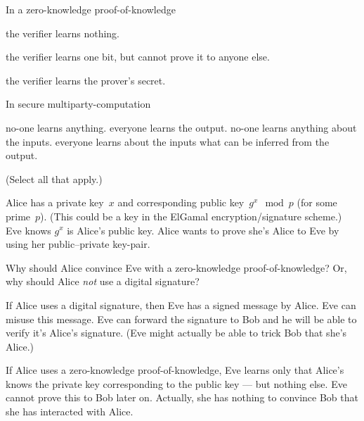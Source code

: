 \questions
In a zero-knowledge proof-of-knowledge
\begin{choices}
  \choice the verifier learns nothing.

  \CorrectChoice the verifier learns one bit, but cannot prove it to anyone 
  else.

  \choice the verifier learns the prover's secret.
\end{choices}


\question
In secure multiparty-computation
\begin{checkboxes}
  \choice no-one learns anything.
  \CorrectChoice everyone learns the output.
  \choice no-one learns anything about the inputs.
  \CorrectChoice everyone learns about the inputs what can be inferred from the 
  output.
\end{checkboxes}
(Select all that apply.)


\question[3]
Alice has a private key~\(x\) and corresponding public key~\(g^x \mod p\) (for 
some prime~\(p\)).
(This could be a key in the ElGamal encryption/signature scheme.)
Eve knows \(g^x\) is Alice's public key.
Alice wants to prove she's Alice to Eve by using her public--private key-pair.

Why should Alice convince Eve with a zero-knowledge proof-of-knowledge?
Or, why should Alice \emph{not} use a digital signature?

\begin{solution}
  If Alice uses a digital signature, then Eve has a signed message by Alice.
  Eve can misuse this message.
  Eve can forward the signature to Bob and he will be able to verify it's 
  Alice's signature.
  (Eve might actually be able to trick Bob that she's Alice.)

  If Alice uses a zero-knowledge proof-of-knowledge, Eve learns only that 
  Alice's knows the private key corresponding to the public key --- but nothing 
  else.
  Eve cannot prove this to Bob later on.
  Actually, she has nothing to convince Bob that she has interacted with Alice.
\end{solution}
